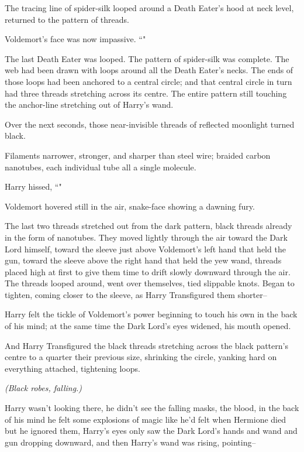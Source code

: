 The tracing line of spider-silk looped around a Death Eater's hood at neck level, returned to the pattern of threads.

Voldemort's face was now impassive. ``"

The last Death Eater was looped. The pattern of spider-silk was complete. The web had been drawn with loops around all the Death Eater's necks. The ends of those loops had been anchored to a central circle; and that central circle in turn had three threads stretching across its centre. The entire pattern still touching the anchor-line stretching out of Harry's wand.

Over the next seconds, those near-invisible threads of reflected moonlight turned black.

Filaments narrower, stronger, and sharper than steel wire; braided carbon nanotubes, each individual tube all a single molecule.

Harry hissed, ``"

Voldemort hovered still in the air, snake-face showing a dawning fury.

The last two threads stretched out from the dark pattern, black threads already in the form of nanotubes. They moved lightly through the air toward the Dark Lord himself, toward the sleeve just above Voldemort's left hand that held the gun, toward the sleeve above the right hand that held the yew wand, threads placed high at first to give them time to drift slowly downward through the air. The threads looped around, went over themselves, tied slippable knots. Began to tighten, coming closer to the sleeve, as Harry Transfigured them shorter\---

Harry felt the tickle of Voldemort's power beginning to touch his own in the back of his mind; at the same time the Dark Lord's eyes widened, his mouth opened.

And Harry Transfigured the black threads stretching across the black pattern's centre to a quarter their previous size, shrinking the circle, yanking hard on everything attached, tightening loops.

\emph{(Black robes, falling.)}

Harry wasn't looking there, he didn't see the falling masks, the blood, in the back of his mind he felt some explosions of magic like he'd felt when Hermione died but he ignored them, Harry's eyes only saw the Dark Lord's hands and wand and gun dropping downward, and then Harry's wand was rising, pointing\---

